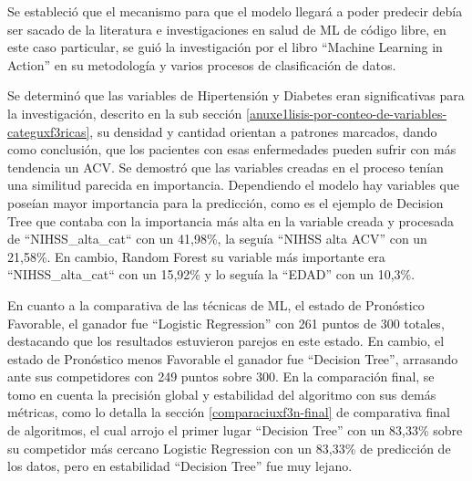 \par Se estableció que el mecanismo para que el modelo llegará a poder predecir debía ser sacado de la literatura e investigaciones en salud de ML de código libre, en este caso particular, se guió la investigación por el libro “Machine Learning in Action” en su metodología y varios procesos de clasificación de datos. \\

\par Se determinó que las variables de Hipertensión y Diabetes eran significativas para la investigación, descrito en la sub sección \ref{anuxe1lisis-por-conteo-de-variables-categuxf3ricas}, su densidad y cantidad orientan a patrones marcados, dando como conclusión, que los pacientes con esas enfermedades pueden sufrir con más tendencia un ACV. Se demostró que las variables creadas en el proceso tenían una similitud parecida en importancia. Dependiendo el modelo hay variables que poseían mayor importancia para la predicción, como es el ejemplo de Decision Tree que contaba con la importancia más alta en la variable creada y procesada de “NIHSS\_alta\_cat“ con un 41,98\%, la seguía “NIHSS alta ACV” con un 21,58\%. En cambio, Random Forest su variable más importante era “NIHSS\_alta\_cat“ con un 15,92\% y lo seguía la “EDAD” con un 10,3\%.\\

\par En cuanto a la comparativa de las técnicas de ML, el estado de Pronóstico Favorable, el ganador fue “Logistic Regression” con 261 puntos de 300 totales, destacando que los resultados estuvieron parejos en este estado. En cambio, el estado de Pronóstico menos Favorable el ganador fue “Decision Tree”, arrasando ante sus competidores con 249 puntos sobre 300. En la comparación final, se tomo en cuenta la precisión global y estabilidad del algoritmo con sus demás métricas, como lo detalla la sección \ref{comparaciuxf3n-final} de comparativa final de algoritmos, el cual arrojo el primer lugar “Decision Tree” con un 83,33\% sobre su competidor más cercano Logistic Regression con un 83,33\% de predicción de los datos, pero en estabilidad “Decision Tree” fue muy lejano.\\

